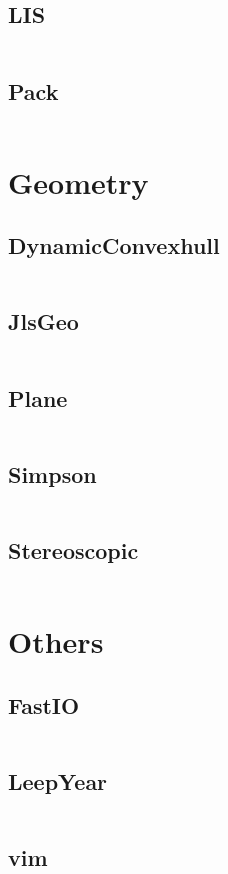 \documentclass[a4paper,11pt]{article}
\begin{document}
\subsection{LIS}
\inputminted[breaklines]{c++}{05++DynamicProgramming/+LIS.cpp}
\subsection{Pack}
\inputminted[breaklines]{c++}{05++DynamicProgramming/+Pack.cpp}

\newpage
\section{Geometry}
\subsection{DynamicConvexhull}
\inputminted[breaklines]{c++}{06++Geometry/+DynamicConvexhull.cpp}
\subsection{JlsGeo}
\inputminted[breaklines]{c++}{06++Geometry/+JlsGeo.cpp}
\subsection{Plane}
\inputminted[breaklines]{c++}{06++Geometry/+Plane.cpp}
\subsection{Simpson}
\inputminted[breaklines]{c++}{06++Geometry/+Simpson.cpp}
\subsection{Stereoscopic}
\inputminted[breaklines]{c++}{06++Geometry/+Stereoscopic.cpp}

\newpage
\section{Others}
\subsection{FastIO}
\inputminted[breaklines]{c++}{07++Others/+FastIO.cpp}
\subsection{LeepYear}
\inputminted[breaklines]{c++}{07++Others/+LeepYear.cpp}
\subsection{vim}
\inputminted[breaklines]{c++}{07++Others/+vim.vim}

\newpage
\end{document}
